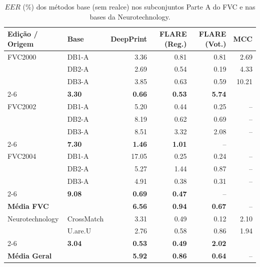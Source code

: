 \begin{table}[htbp]
\centering
\small
\caption{$EER$ (\%) dos métodos base (sem realce) nos subconjuntos Parte A do FVC e nas bases da Neurotechnology.}\label{tab:eer_base}
\setlength{\tabcolsep}{7pt}
\begin{tabular}{ll rrrr}
\toprule
\textbf{Edição / Origem} & \textbf{Base} & \textbf{DeepPrint} & \textbf{FLARE (Reg.)} & \textbf{FLARE (Vot.)} & \textbf{MCC} \\
\midrule
FVC2000 & DB1-A & 3.36 & 0.81 & 0.81 & 2.69 \\
 & DB2-A & 2.69 & 0.54 & 0.19 & 4.33 \\
 & DB3-A & 3.85 & 0.63 & 0.59 & 10.21 \\
\cmidrule{2-6}
\multicolumn{2}{l}{\textbf{Média FVC2000}} & \textbf{3.30} & \textbf{0.66} & \textbf{0.53} & \textbf{5.74} \\
\midrule
FVC2002 & DB1-A & 5.20 & 0.44 & 0.25 & -- \\
 & DB2-A & 8.19 & 0.62 & 0.69 & -- \\
 & DB3-A & 8.51 & 3.32 & 2.08 & -- \\
\cmidrule{2-6}
\multicolumn{2}{l}{\textbf{Média FVC2002}} & \textbf{7.30} & \textbf{1.46} & \textbf{1.01} & -- \\
\midrule
FVC2004 & DB1-A & 17.05 & 0.25 & 0.24 & -- \\
 & DB2-A & 5.27 & 1.44 & 0.87 & -- \\
 & DB3-A & 4.91 & 0.38 & 0.31 & -- \\
\cmidrule{2-6}
\multicolumn{2}{l}{\textbf{Média FVC2004}} & \textbf{9.08} & \textbf{0.69} & \textbf{0.47} & -- \\
\midrule
\multicolumn{2}{l}{\textbf{Média FVC}} & \textbf{6.56} & \textbf{0.94} & \textbf{0.67} & -- \\
\midrule
Neurotechnology & CrossMatch & 3.31 & 0.49 & 0.12 & 2.10 \\
 & U.are.U & 2.76 & 0.58 & 0.86 & 1.94 \\
\cmidrule{2-6}
\multicolumn{2}{l}{\textbf{Média Neurotechnology}} & \textbf{3.04} & \textbf{0.53} & \textbf{0.49} & \textbf{2.02} \\
\midrule[\heavyrulewidth]
\multicolumn{2}{l}{\textbf{Média Geral}} & \textbf{5.92} & \textbf{0.86} & \textbf{0.64} & -- \\
\bottomrule
\end{tabular}
\end{table}


